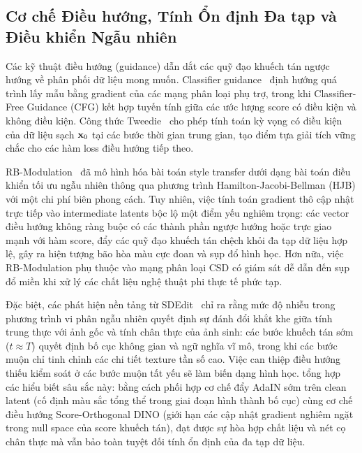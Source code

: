 \documentclass[runningheads]{llncs}
\begin{document}
\subsection{Cơ chế Điều hướng, Tính Ổn định Đa tạp và Điều khiển Ngẫu nhiên}
Các kỹ thuật điều hướng (guidance) dẫn dắt các quỹ đạo khuếch tán ngược hướng về phân phối dữ liệu mong muốn. Classifier guidance~\cite{dhariwal2021diffusion} định hướng quá trình lấy mẫu bằng gradient của các mạng phân loại phụ trợ, trong khi Classifier-Free Guidance (CFG) kết hợp tuyến tính giữa các ước lượng score có điều kiện và không điều kiện. Công thức Tweedie~\cite{tweedie} cho phép tính toán kỳ vọng có điều kiện của dữ liệu sạch $\mathbf{x}_0$ tại các bước thời gian trung gian, tạo điểm tựa giải tích vững chắc cho các hàm loss điều hướng tiếp theo.

RB-Modulation~\cite{rout2025rbmodulation} đã mô hình hóa bài toán style transfer dưới dạng bài toán điều khiển tối ưu ngẫu nhiên thông qua phương trình Hamilton-Jacobi-Bellman (HJB) với một chi phí biên phong cách. Tuy nhiên, việc tính toán gradient thô cập nhật trực tiếp vào intermediate latents bộc lộ một điểm yếu nghiêm trọng: các vector điều hướng không ràng buộc có các thành phần ngược hướng hoặc trực giao mạnh với hàm score, đẩy các quỹ đạo khuếch tán chệch khỏi đa tạp dữ liệu hợp lệ, gây ra hiện tượng bão hòa màu cực đoan và sụp đổ hình học. Hơn nữa, việc RB-Modulation phụ thuộc vào mạng phân loại CSD có giám sát dễ dẫn đến sụp đổ miền khi xử lý các chất liệu nghệ thuật phi thực tế phức tạp.

Đặc biệt, các phát hiện nền tảng từ SDEdit~\cite{sdedit} chỉ ra rằng mức độ nhiễu trong phương trình vi phân ngẫu nhiên quyết định sự đánh đổi khắt khe giữa tính trung thực với ảnh gốc và tính chân thực của ảnh sinh: các bước khuếch tán sớm ($t \approx T$) quyết định bố cục không gian và ngữ nghĩa vĩ mô, trong khi các bước muộn chỉ tinh chỉnh các chi tiết texture tần số cao. Việc can thiệp điều hướng thiếu kiểm soát ở các bước muộn tất yếu sẽ làm biến dạng hình học. \method tổng hợp các hiểu biết sâu sắc này: bằng cách phối hợp cơ chế đẩy AdaIN sớm trên clean latent (cố định màu sắc tổng thể trong giai đoạn hình thành bố cục) cùng cơ chế điều hướng Score-Orthogonal DINO (giới hạn các cập nhật gradient nghiêm ngặt trong null space của score khuếch tán), \method đạt được sự hòa hợp chất liệu và nét cọ chân thực mà vẫn bảo toàn tuyệt đối tính ổn định của đa tạp dữ liệu.

\end{document}
